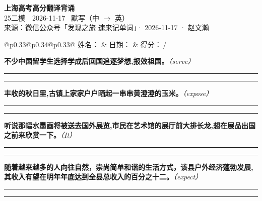 \documentclass[11pt,a4paper]{article}
\newcommand{\num}[1]{\makebox[1.9em][r]{#1.}\hspace{0.3em}}
\newcommand{\wline}{\noindent\rule{\linewidth}{0.4pt}}
\newcommand{\prompt}[1]{\emph{\textcolor{tipblue}{\small（#1）}}}
\begin{document}
\pagestyle{plain}
\begin{center}
{\LARGE\bfseries 上海高考高分翻译背诵 }\\[0.25em]
{\large 25二模　2026-11-17 \quad\ 默写（中 $\to$ 英）}\\[0.35em]
{\footnotesize 来源：微信公众号「发现之旅 速来记单词」· 2026-11-17 · 赵文瀚}
\end{center}

\vspace{0.4em}
\noindent\begin{tabular}{@{}p{0.33\textwidth}@{}p{0.34\textwidth}@{}p{0.33\textwidth}@{}}
姓名：\underline{\hspace{2.0cm}} & 日期：\underline{\hspace{2.0cm}} & 得分：\underline{\hspace{1.4cm}}\,/ \\
\end{tabular}

\vspace{0.5em}

\vspace{0.8em}
\num{1}\textbf{不少中国留学生选择学成后回国追逐梦想,报效祖国。}\prompt{serve}

\vspace{0.3em}

\wline\vspace{0.3em}
\wline

\num{2}\textbf{丰收的秋日里,古镇上家家户户晒起一串串黄澄澄的玉米。}\prompt{expose}

\vspace{0.3em}

\wline\vspace{0.3em}
\wline

\num{3}\textbf{听说那幅水墨画将被送去国外展览,市民在艺术馆的展厅前大排长龙,想在展品出国之前来欣赏一下。}\prompt{It}

\vspace{0.3em}

\wline\vspace{0.3em}
\wline

\num{4}\textbf{随着越来越多的人向往自然，崇尚简单和谐的生活方式，该县户外经济蓬勃发展,其收入有望在明年年底达到全县总收入的百分之十二。}\prompt{expect}

\vspace{0.3em}

\wline\vspace{0.3em}
\wline
\end{document}
